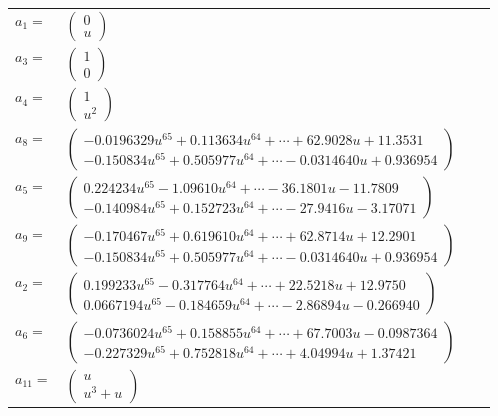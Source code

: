 \documentclass[1p]{elsarticle_modified}
\theoremstyle{definition}
\begin{document}
\begin{tabular}{m{7pt} m{180pt} m{7pt} m{180pt} }
\flushright $a_{1}=$&$\begin{pmatrix}0\\u\end{pmatrix}$ \\
\flushright $a_{3}=$&$\begin{pmatrix}1\\0\end{pmatrix}$ \\
\flushright $a_{4}=$&$\begin{pmatrix}1\\u^2\end{pmatrix}$ \\
\flushright $a_{8}=$&$\begin{pmatrix}-0.0196329 u^{65}+0.113634 u^{64}+\cdots+62.9028 u+11.3531\\-0.150834 u^{65}+0.505977 u^{64}+\cdots-0.0314640 u+0.936954\end{pmatrix}$ \\
\flushright $a_{5}=$&$\begin{pmatrix}0.224234 u^{65}-1.09610 u^{64}+\cdots-36.1801 u-11.7809\\-0.140984 u^{65}+0.152723 u^{64}+\cdots-27.9416 u-3.17071\end{pmatrix}$ \\
\flushright $a_{9}=$&$\begin{pmatrix}-0.170467 u^{65}+0.619610 u^{64}+\cdots+62.8714 u+12.2901\\-0.150834 u^{65}+0.505977 u^{64}+\cdots-0.0314640 u+0.936954\end{pmatrix}$ \\
\flushright $a_{2}=$&$\begin{pmatrix}0.199233 u^{65}-0.317764 u^{64}+\cdots+22.5218 u+12.9750\\0.0667194 u^{65}-0.184659 u^{64}+\cdots-2.86894 u-0.266940\end{pmatrix}$ \\
\flushright $a_{6}=$&$\begin{pmatrix}-0.0736024 u^{65}+0.158855 u^{64}+\cdots+67.7003 u-0.0987364\\-0.227329 u^{65}+0.752818 u^{64}+\cdots+4.04994 u+1.37421\end{pmatrix}$ \\
\flushright $a_{11}=$&$\begin{pmatrix}u\\u^3+u\end{pmatrix}$ \\

\end{tabular}
\end{document}
